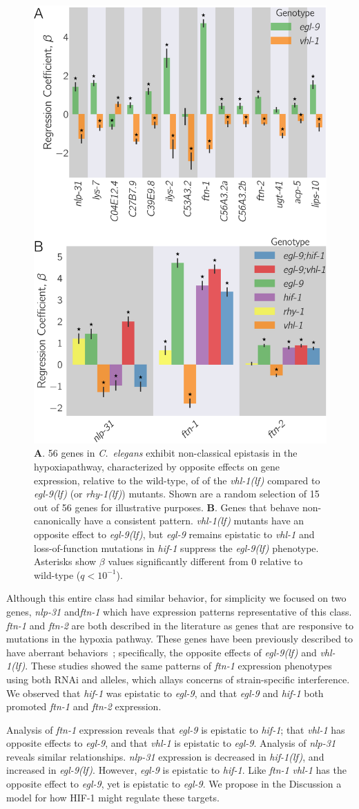 \documentclass[9pt,twocolumn,twoside]{pnas-new}
\newcommand{\qval}[1]{$q<10^{-#1}$}
\newcommand{\cel}{\emph{C.~elegans}}
\newcommand{\gene}[1]{\mbox{\emph{#1}}}
\newcommand{\nlp}{\gene{nlp-31}}
\newcommand{\ftna}{\gene{ftn-1}}
\newcommand{\ftnb}{\gene{ftn-2}}
\newcommand{\egl}{\gene{egl-9(lf)}}
\newcommand{\rhy}{\gene{rhy-1(lf)}}
\newcommand{\vhl}{\gene{vhl-1(lf)}}
\newcommand{\hif}{\gene{hif-1(lf)}}
\newcommand{\hifp}{HIF-1}
\newcommand{\hifohtargets}{56}
\begin{document}
\begin{figure}[tbhp]
  \centering
  \includegraphics[width=.4\textwidth]{../figs/hif1oh_epistasis.pdf}
  \caption{
    \textbf{A}. \hifohtargets{} genes in \cel{} exhibit non-classical epistasis
    in the hypoxiapathway, characterized by opposite effects on gene expression,
    relative to the wild-type, of of the \vhl{} compared to \egl{} (or \rhy{})
    mutants. Shown are a random selection of 15 out of \hifohtargets{} genes for
    illustrative purposes. \textbf{B}. Genes that behave non-canonically  have a
    consistent pattern. \vhl{} mutants have an opposite effect to \egl{}, but
    \gene{egl-9} remains epistatic to \gene{vhl-1} and loss-of-function
    mutations in \gene{hif-1} suppress the \egl{} phenotype. Asterisks show
    $\beta$ values significantly different from 0 relative to wild-type
    (\qval{1}).
  }
\label{fig:hif1oh}
\end{figure}

Although this entire class had similar behavior, for simplicity we focused on
two genes, \nlp{} and\ftna{} which have expression patterns representative
of this class. \ftna{} and \ftnb{} are both described in
the literature as genes that are responsive to mutations in the hypoxia pathway.
These genes have been previously described to have aberrant
behaviors~\cite{Ackerman2012,Romney2011}; specifically, the opposite effects of
\egl{} and \vhl{}. These studies showed the same patterns of \ftna{}
expression phenotypes using both RNAi and alleles, which allays concerns of
strain-specific interference.
We observed that \gene{hif-1} was epistatic to
\gene{egl-9}, and that \gene{egl-9} and \gene{hif-1} both promoted \ftna{} and
\ftnb{} expression.

Analysis of \ftna{} expression reveals that \gene{egl-9} is
epistatic to \gene{hif-1}; that \gene{vhl-1} has opposite effects to
\gene{egl-9}, and that \gene{vhl-1} is epistatic to \gene{egl-9}. Analysis of
\nlp{} reveals similar relationships. \nlp{} expression is decreased in \hif{},
and increased in \egl{}. However, \gene{egl-9} is epistatic to \gene{hif-1}.
Like \ftna{} \gene{vhl-1} has the opposite effect to \gene{egl-9},
yet is epistatic to \gene{egl-9}. We propose in the Discussion a model for how
\hifp{} might regulate these targets.
\end{document}
